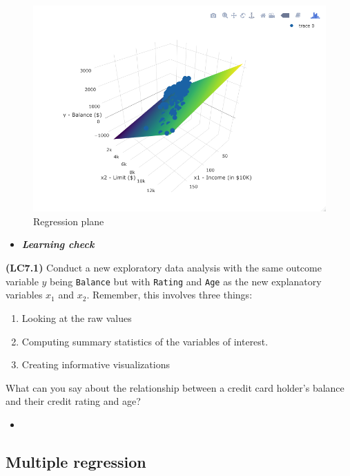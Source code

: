 \documentclass[12pt, krantz2,]{krantz}
\providecommand{\tightlist}{%
  \setlength{\itemsep}{0pt}\setlength{\parskip}{0pt}}
\newenvironment{rmdblock}[1]
  {\begin{shaded*}
  \begin{itemize}
  \renewcommand{\labelitemi}{
    \raisebox{-.7\height}[0pt][0pt]{
    }
  }
  \item
  }
  {
  \end{itemize}
  \end{shaded*}
  }
\newenvironment{learncheck}
  {\begin{rmdblock}{warning}}
  {\end{rmdblock}}
\begin{document}
\begin{figure}

{\centering \includegraphics[width=\textwidth]{images/credit_card_balance_regression_plane} 

}

\caption{Regression plane}\label{fig:unnamed-chunk-205}
\end{figure}

\begin{learncheck}
\textbf{\emph{Learning check}}
\end{learncheck}

\textbf{(LC7.1)} Conduct a new exploratory data analysis with the same outcome variable \(y\) being \texttt{Balance} but with \texttt{Rating} and \texttt{Age} as the new explanatory variables \(x_1\) and \(x_2\). Remember, this involves three things:

\begin{enumerate}
\def\labelenumi{\alph{enumi})}
\tightlist
\item
  Looking at the raw values
\item
  Computing summary statistics of the variables of interest.
\item
  Creating informative visualizations
\end{enumerate}

What can you say about the relationship between a credit card holder's balance and their credit rating and age?

\begin{learncheck}

\end{learncheck}

\hypertarget{model3table}{%
\subsection{Multiple regression}\label{model3table}}
\end{document}
